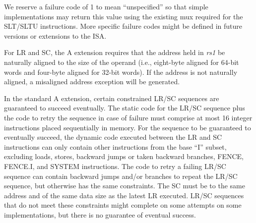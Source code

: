 \begin{commentary}
We reserve a failure code of 1 to mean ``unspecified'' so that simple
implementations may return this value using the existing mux required
for the SLT/SLTU instructions.  More specific failure codes might be
defined in future versions or extensions to the ISA.
\end{commentary}

For LR and SC, the A extension requires that the address held in {\em rs1} be
naturally aligned to the size of the operand (i.e., eight-byte aligned for
64-bit words and four-byte aligned for 32-bit words).  If the address is
not naturally aligned, a misaligned address exception will be generated.

\label{lrscseq}

In the standard A extension, certain constrained LR/SC sequences are
guaranteed to succeed eventually.  The static code for the LR/SC
sequence plus the code to retry the sequence in case of failure must
comprise at most 16 integer instructions placed sequentially in
memory.  For the sequence to be guaranteed to eventually succeed, the
dynamic code executed between the LR and SC instructions can only
contain other instructions from the base ``I'' subset, excluding
loads, stores, backward jumps or taken backward branches, FENCE,
FENCE.I, and SYSTEM instructions.  The code to retry a failing LR/SC
sequence can contain backward jumps and/or branches to repeat the
LR/SC sequence, but otherwise has the same constraints.  The SC must
be to the same address and of the same data size as the latest LR
executed.  LR/SC sequences that do not meet these constraints might
complete on some attempts on some implementations, but there is no
guarantee of eventual success.

